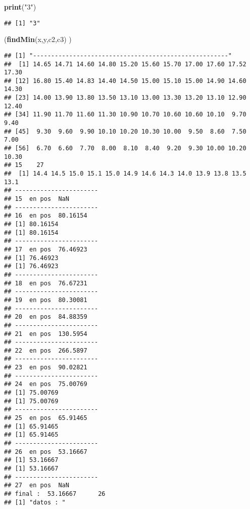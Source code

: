 \documentclass[]{article}
\newenvironment{Shaded}{\begin{snugshade}}{\end{snugshade}}
\newcommand{\KeywordTok}[1]{\textcolor[rgb]{0.13,0.29,0.53}{\textbf{#1}}}
\newcommand{\StringTok}[1]{\textcolor[rgb]{0.31,0.60,0.02}{#1}}
\newcommand{\NormalTok}[1]{#1}
\begin{document}
\begin{Shaded}
\begin{Highlighting}[]
\KeywordTok{print}\NormalTok{(}\StringTok{"3"}\NormalTok{)}
\end{Highlighting}
\end{Shaded}

\begin{verbatim}
## [1] "3"
\end{verbatim}

\begin{Shaded}
\begin{Highlighting}[]
\NormalTok{(}\KeywordTok{findMin}\NormalTok{(x,y,c2,c3) )}
\end{Highlighting}
\end{Shaded}

\begin{verbatim}
## [1] "------------------------------------------------------"
##  [1] 14.65 14.71 14.60 14.80 15.20 15.60 15.70 17.00 17.60 17.52 17.30
## [12] 16.80 15.40 14.83 14.40 14.50 15.00 15.10 15.00 14.90 14.60 14.30
## [23] 14.00 13.90 13.80 13.50 13.10 13.00 13.30 13.20 13.10 12.90 12.40
## [34] 11.90 11.70 11.60 11.30 10.90 10.70 10.60 10.60 10.10  9.70  9.40
## [45]  9.30  9.60  9.90 10.10 10.20 10.30 10.00  9.50  8.60  7.50  7.00
## [56]  6.70  6.60  7.70  8.00  8.10  8.40  9.20  9.30 10.00 10.20 10.30
## 15    27 
##  [1] 14.4 14.5 15.0 15.1 15.0 14.9 14.6 14.3 14.0 13.9 13.8 13.5 13.1
## -----------------------
## 15  en pos  NaN 
## -----------------------
## 16  en pos  80.16154 
## [1] 80.16154
## [1] 80.16154
## -----------------------
## 17  en pos  76.46923 
## [1] 76.46923
## [1] 76.46923
## -----------------------
## 18  en pos  76.67231 
## -----------------------
## 19  en pos  80.30081 
## -----------------------
## 20  en pos  84.88359 
## -----------------------
## 21  en pos  130.5954 
## -----------------------
## 22  en pos  266.5897 
## -----------------------
## 23  en pos  90.02821 
## -----------------------
## 24  en pos  75.00769 
## [1] 75.00769
## [1] 75.00769
## -----------------------
## 25  en pos  65.91465 
## [1] 65.91465
## [1] 65.91465
## -----------------------
## 26  en pos  53.16667 
## [1] 53.16667
## [1] 53.16667
## -----------------------
## 27  en pos  NaN 
## final :  53.16667      26 
## [1] "datos : "
\end{verbatim}
\end{document}
